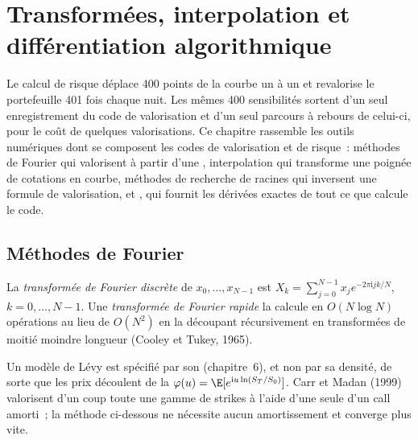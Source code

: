 \chapter{Transformées, interpolation et différentiation algorithmique}\label{ch:qm:transforms-interpolation-and-algorithmic-differentiation}

Le calcul de risque déplace 400 points de la courbe un à un et revalorise le portefeuille 401 fois chaque nuit. Les mêmes 400 sensibilités sortent d'un seul enregistrement du code de valorisation et d'un seul parcours
à rebours de celui-ci, pour le coût de quelques valorisations. Ce chapitre rassemble les outils numériques dont se composent les codes de valorisation et de risque~: méthodes de Fourier qui valorisent à partir d'une , interpolation qui
transforme une poignée de cotations en courbe, méthodes de recherche de racines qui inversent une formule de valorisation, et , qui fournit les dérivées exactes de tout ce que calcule le code.

\section{Méthodes de Fourier}

\begin{definition}\label{def:qm:transforms-interpolation-and-algorithmic-differentiation:dft}
La \emph{transformée de Fourier discrète} de $x_0, \dots, x_{N-1}$ est $X_k = \sum_{j=0}^{N-1}x_je^{-2\pi\mathrm ijk/N}$, $k = 0, \dots, N - 1$. Une \emph{transformée de Fourier
rapide} la calcule en $O(N\log N)$ opérations au lieu de $O(N^2)$ en la découpant récursivement en transformées de moitié moindre longueur (Cooley et Tukey, 1965).
\end{definition}

Un modèle de Lévy est spécifié par son  (chapitre~6), et non par sa densité, de sorte que les prix découlent de la  $\varphi(u) = \E[e^{\mathrm iu\ln(S_T/S_0)}]$. Carr et Madan (1999)
valorisent d'un coup toute une gamme de strikes à l'aide d'une seule  d'un call amorti~; la méthode ci-dessous ne nécessite aucun amortissement et converge plus vite.

